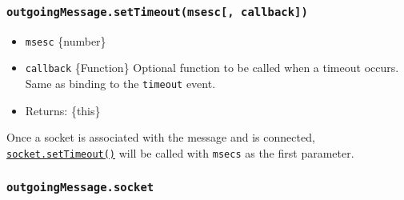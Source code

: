 \begin{Shaded}
\begin{Highlighting}[]
\OperatorTok{=}\OperatorTok{,}\KeywordTok{=\textgreater{}}\NormalTok{ \{}
  \OperatorTok{=}  \NormalTok{(\{ }\OperatorTok{:} \NormalTok{ \})}\OperatorTok{;}
\OperatorTok{;}
\NormalTok{(}\OperatorTok{,}\NormalTok{ \{ }\OperatorTok{:} \NormalTok{ \})}\OperatorTok{;}
\NormalTok{(}\NormalTok{)}\OperatorTok{;}
\NormalTok{\})}\OperatorTok{;}
\end{Highlighting}
\end{Shaded}

\subsubsection{\texorpdfstring{\texttt{outgoingMessage.setTimeout(msesc{[},\ callback{]})}}{outgoingMessage.setTimeout(msesc{[}, callback{]})}}\label{outgoingmessage.settimeoutmsesc-callback}

\begin{itemize}
\tightlist
\item
  \texttt{msesc} \{number\}
\item
  \texttt{callback} \{Function\} Optional function to be called when a
  timeout occurs. Same as binding to the \texttt{timeout} event.
\item
  Returns: \{this\}
\end{itemize}

Once a socket is associated with the message and is connected,
\href{net.md\#socketsettimeouttimeout-callback}{\texttt{socket.setTimeout()}}
will be called with \texttt{msecs} as the first parameter.

\subsubsection{\texorpdfstring{\texttt{outgoingMessage.socket}}{outgoingMessage.socket}}\label{outgoingmessage.socket}

